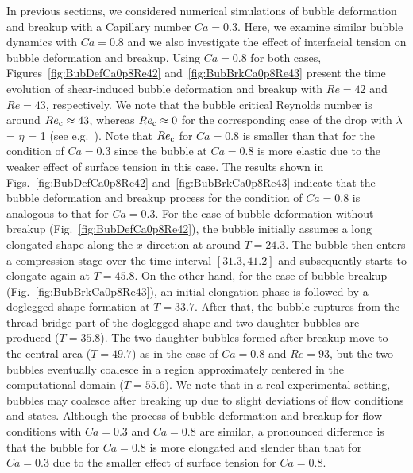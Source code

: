 \documentclass[review]{elsarticle}
\begin{document}
%
%
In previous sections, we considered numerical simulations of bubble deformation
and breakup with a Capillary number $Ca = 0.3$.  Here, we examine similar
bubble dynamics with $Ca = 0.8$ and we also investigate the effect of
interfacial tension on bubble deformation and breakup.  Using $Ca=0.8$ for both
cases, Figures~\ref{fig:BubDefCa0p8Re42} and~\ref{fig:BubBrkCa0p8Re43} present
the time evolution of shear-induced bubble deformation and breakup with $Re=42$
and $Re=43$, respectively.  We note that the bubble critical Reynolds number is
around $Re_{\rm c} \approx 43$, whereas $Re_{\rm c} \approx 0$ for the corresponding
case of the drop with 
$\lambda$ = $\eta$ = 1 (see e.g.~\cite{LiRenRen00}).
Note that $Re_{\rm c}$ for $Ca = 0.8$ is smaller than that for the condition of $Ca
= 0.3$ since the bubble at $Ca = 0.8$ is more elastic due to the weaker effect
of surface tension in this case.  The results shown in
Figs.~\ref{fig:BubDefCa0p8Re42} and~\ref{fig:BubBrkCa0p8Re43} indicate that the
bubble deformation and breakup process for the condition of $Ca = 0.8$ is
analogous to that for $Ca = 0.3$.  For the case of bubble deformation without
breakup (Fig.~\ref{fig:BubDefCa0p8Re42}), the bubble initially assumes a long
elongated shape along the $x$-direction at around $T=24.3$. The bubble then
enters a compression stage over the time interval $[31.3,41.2]$ and
subsequently starts to elongate again at $T = 45.8$.  On the other hand, for
the case of bubble breakup (Fig.~\ref{fig:BubBrkCa0p8Re43}), an initial
elongation phase is followed by a doglegged shape formation at $T=33.7$.  After
that, the bubble ruptures from the thread-bridge part of the doglegged shape
and two daughter bubbles are produced ($T = 35.8$).  The two daughter bubbles
formed after breakup move to the central area ($T = 49.7$) as in the case of
$Ca = 0.8$ and $Re = 93$, but the two bubbles eventually coalesce in a region
approximately centered in the computational domain ($T = 55.6$).  We note that
in a real experimental setting, bubbles may coalesce after breaking up due to
slight deviations of flow conditions and states.  Although the process of
bubble deformation and breakup for flow conditions with $Ca = 0.3$ and $Ca =
0.8$ are similar, a pronounced difference is that the bubble for $Ca = 0.8$ is
more elongated and slender than that for $Ca = 0.3$ due to the smaller effect
of surface tension for $Ca = 0.8$.
\end{document}
